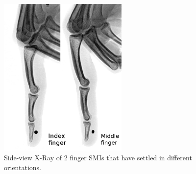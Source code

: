 \documentclass[10pt,journal,compsoc]{IEEEtran}
\begin{document}
			\begin{figure}[!t]
				\centering
				\includegraphics[width=2.5in]{FingersXrayNeg}
				\caption{Side-view X-Ray of 2 finger SMIs that have settled in different orientations.}
				\label{FingersXray}
			\end{figure}
			
%		
%			
			
\end{document}
